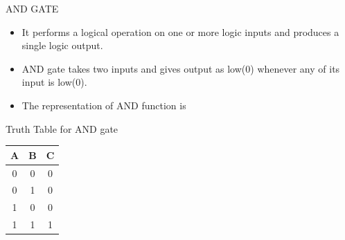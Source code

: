 \documentclass{beamer}
\begin{document}
\begin{frame}[label=AND]{AND GATE}
\begin{block}{}
    \begin{itemize}
	\item It performs a logical operation on one or more logic inputs and produces a single logic output.
	\item AND gate takes two inputs and gives output as low(0) whenever any of its input is low(0).   
	\item The representation of \alert{AND} function is  
    \end{itemize}
  \end{block}
\pause
\begin{block}[label=AND]{Truth Table for AND gate}
\begin{tabular}{|c|c||c|}
\hline
 \textbf{A} &
\textbf{B} & \textbf{C} \\
\hline
\hline
 0 & 0 & 0 \\
\hline
 0 & 1 & 0 \\
\hline
 1 & 0 & 0 \\
\hline
 1 & 1 & 1 \\
\hline
\end{tabular}
\end{block}
\end{frame}
\end{document}

